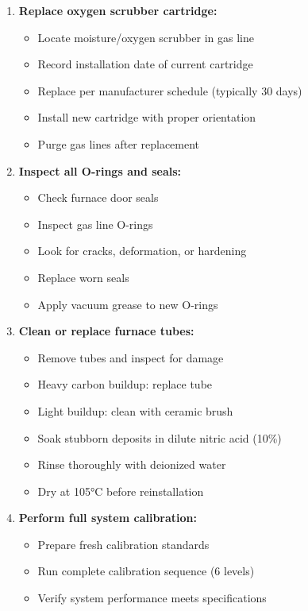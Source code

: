 \documentclass[11pt,a4paper]{article}\usepackage[]{graphicx}\usepackage[]{xcolor}
\begin{document}
\begin{enumerate}[noitemsep]
    \item \textbf{Replace oxygen scrubber cartridge:}
    \begin{itemize}
        \item Locate moisture/oxygen scrubber in gas line
        \item Record installation date of current cartridge
        \item Replace per manufacturer schedule (typically 30 days)
        \item Install new cartridge with proper orientation
        \item Purge gas lines after replacement
    \end{itemize}
    \item \textbf{Inspect all O-rings and seals:}
    \begin{itemize}
        \item Check furnace door seals
        \item Inspect gas line O-rings
        \item Look for cracks, deformation, or hardening
        \item Replace worn seals
        \item Apply vacuum grease to new O-rings
    \end{itemize}
    \item \textbf{Clean or replace furnace tubes:}
    \begin{itemize}
        \item Remove tubes and inspect for damage
        \item Heavy carbon buildup: replace tube
        \item Light buildup: clean with ceramic brush
        \item Soak stubborn deposits in dilute nitric acid (10\%)
        \item Rinse thoroughly with deionized water
        \item Dry at 105°C before reinstallation
    \end{itemize}
    \item \textbf{Perform full system calibration:}
    \begin{itemize}
        \item Prepare fresh calibration standards
        \item Run complete calibration sequence (6 levels)
        \item Verify system performance meets specifications

\end{itemize}
\end{enumerate}
\end{document}
